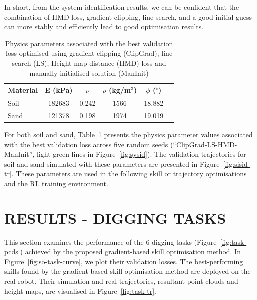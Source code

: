 \documentclass[letterpaper, 10 pt, journal, twoside]{ieeetran}
\begin{document}
In short, from the system identification results, we can be confident that the combination of HMD loss, gradient clipping, line search, and a good initial guess can more stably and efficiently lead to good optimisation results. 

\begin{table}[h]
\centering
\begin{tabular}{lccccc}
\toprule
Material             & E (kPa) & $\nu$ & $\rho$ (kg/m$^3$) & $\phi$ ($^\circ$)\\
\midrule
Soil                 & 182683 & 0.242 & 1566 & 18.882\\
\midrule
Sand                 & 121378 & 0.198 & 1974 & 19.019\\
\bottomrule
\end{tabular}
\caption{Physics parameters associated with the best validation loss optimised using gradient clipping (ClipGrad), line search (LS), Height map distance (HMD) loss and manually initialised solution (ManInit)\label{tab:sys-id}}
\end{table}

For both soil and sand, Table~\ref{tab:sys-id} presents the physics parameter values associated with the best validation loss across five random seeds (``ClipGrad-LS-HMD-ManInit'', light green lines in Figure~\ref{fig:sysid}). The validation trajectories for soil and sand simulated with these parameters are presented in Figure~\ref{fig:sisid-tr}. These parameters are used in the following skill or trajectory optimisations and the RL training environment.

\section{RESULTS - DIGGING TASKS}\label{sec:result-skill}
This section examines the performance of the $6$ digging tasks (Figure~\ref{fig:task-pcds}) achieved by the proposed gradient-based skill optimisation method. In Figure~\ref{fig:so-task-curve}, we plot their validation losses. The best-performing skills found by the gradient-based skill optimisation method are deployed on the real robot. Their simulation and real trajectories, resultant point clouds and height maps, are visualised in Figure~\ref{fig:task-tr}.
\end{document}
